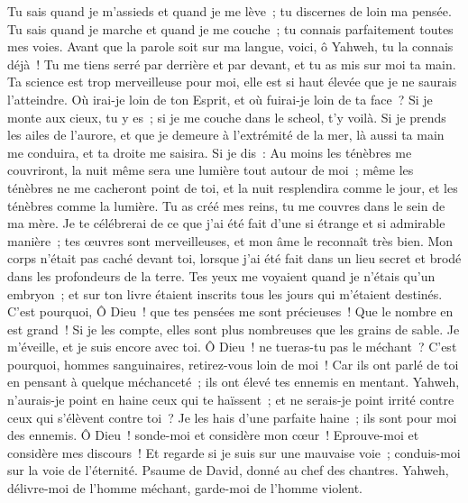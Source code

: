 \begin{multicols}{2}
Tu sais quand je m'assieds et quand je me lève~; tu discernes de loin ma pensée.
Tu sais quand je marche et quand je me couche~; tu connais parfaitement toutes mes voies.
Avant que la parole soit sur ma langue, voici, ô Yahweh, tu la connais déjà~!
Tu me tiens serré par derrière et par devant, et tu as mis sur moi ta main. 
Ta science est trop merveilleuse pour moi, elle est si haut élevée que je ne saurais l'atteindre.
Où irai-je loin de ton Esprit, et où fuirai-je loin de ta face~?
Si je monte aux cieux, tu y es~; si je me couche dans le scheol, t'y voilà.
Si je prends les ailes de l'aurore, et que je demeure à l'extrémité de la mer,
là aussi ta main me conduira, et ta droite me saisira.
Si je dis~: Au moins les ténèbres me couvriront, la nuit même sera une lumière tout autour de moi~;
même les ténèbres ne me cacheront point de toi, et la nuit resplendira comme le jour, et les ténèbres comme la lumière.
Tu as créé mes reins, tu me couvres dans le sein de ma mère.
Je te célébrerai de ce que j'ai été fait d'une si étrange et si admirable manière~; tes œuvres sont merveilleuses, et mon âme le reconnaît très bien.
Mon corps n'était pas caché devant toi, lorsque j'ai été fait dans un lieu secret et brodé dans les profondeurs de la terre.
Tes yeux me voyaient quand je n'étais qu'un embryon~; et sur ton livre étaient inscrits tous les jours qui m'étaient destinés.
C'est pourquoi, Ô Dieu~! que tes pensées me sont précieuses~! Que le nombre en est grand~!
Si je les compte, elles sont plus nombreuses que les grains de sable. Je m'éveille, et je suis encore avec toi.
Ô Dieu~! ne tueras-tu pas le méchant~? C'est pourquoi, hommes sanguinaires, retirez-vous loin de moi~!
Car ils ont parlé de toi en pensant à quelque méchanceté~; ils ont élevé tes ennemis en mentant.
Yahweh, n'aurais-je point en haine ceux qui te haïssent~; et ne serais-je point irrité contre ceux qui s'élèvent contre toi~?
Je les hais d'une parfaite haine~; ils sont pour moi des ennemis.
Ô Dieu~! sonde-moi et considère mon cœur~! Eprouve-moi et considère mes discours~!
Et regarde si je suis sur une mauvaise voie~; conduis-moi sur la voie de l'éternité.
\VerseOne{}Psaume de David, donné au chef des chantres. Yahweh, délivre-moi de l'homme méchant, garde-moi de l'homme violent.

\end{multicols}
